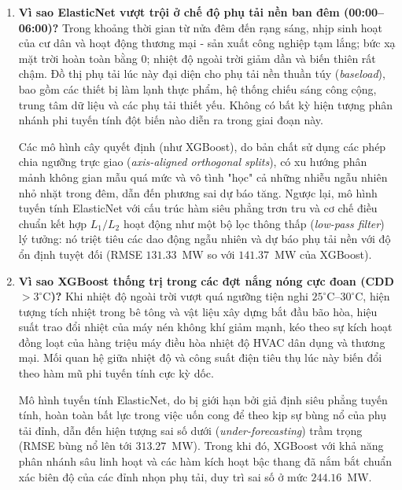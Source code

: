 \begin{enumerate}
    \item \textbf{Vì sao ElasticNet vượt trội ở chế độ phụ tải nền ban đêm (00:00--06:00)?}
    Trong khoảng thời gian từ nửa đêm đến rạng sáng, nhịp sinh hoạt của cư dân và hoạt động thương mại - sản xuất công nghiệp tạm lắng; bức xạ mặt trời hoàn toàn bằng 0; nhiệt độ ngoài trời giảm dần và biến thiên rất chậm. Đồ thị phụ tải lúc này đại diện cho phụ tải nền thuần túy (\textit{baseload}), bao gồm các thiết bị làm lạnh thực phẩm, hệ thống chiếu sáng công cộng, trung tâm dữ liệu và các phụ tải thiết yếu. Không có bất kỳ hiện tượng phân nhánh phi tuyến tính đột biến nào diễn ra trong giai đoạn này. 
    
    Các mô hình cây quyết định (như XGBoost), do bản chất sử dụng các phép chia ngưỡng trực giao (\textit{axis-aligned orthogonal splits}), có xu hướng phân mảnh không gian mẫu quá mức và vô tình "học" cả những nhiễu ngẫu nhiên nhỏ nhặt trong đêm, dẫn đến phương sai dự báo tăng. Ngược lại, mô hình tuyến tính ElasticNet với cấu trúc hàm siêu phẳng trơn tru và cơ chế điều chuẩn kết hợp $L_1/L_2$ hoạt động như một bộ lọc thông thấp (\textit{low-pass filter}) lý tưởng: nó triệt tiêu các dao động ngẫu nhiên và dự báo phụ tải nền với độ ổn định tuyệt đối (RMSE $131.33$~MW so với $141.37$~MW của XGBoost).
    
    \item \textbf{Vì sao XGBoost thống trị trong các đợt nắng nóng cực đoan (CDD $> 3^\circ\text{C}$)?}
    Khi nhiệt độ ngoài trời vượt quá ngưỡng tiện nghi $25^\circ\text{C}$--$30^\circ\text{C}$, hiện tượng tích nhiệt trong bê tông và vật liệu xây dựng bắt đầu bão hòa, hiệu suất trao đổi nhiệt của máy nén không khí giảm mạnh, kéo theo sự kích hoạt đồng loạt của hàng triệu máy điều hòa nhiệt độ HVAC dân dụng và thương mại. Mối quan hệ giữa nhiệt độ và công suất điện tiêu thụ lúc này biến đổi theo hàm mũ phi tuyến tính cực kỳ dốc.
    
    Mô hình tuyến tính ElasticNet, do bị giới hạn bởi giả định siêu phẳng tuyến tính, hoàn toàn bất lực trong việc uốn cong để theo kịp sự bùng nổ của phụ tải đỉnh, dẫn đến hiện tượng sai số dưới (\textit{under-forecasting}) trầm trọng (RMSE bùng nổ lên tới $313.27$~MW). Trong khi đó, XGBoost với khả năng phân nhánh sâu linh hoạt và các hàm kích hoạt bậc thang đã nắm bắt chuẩn xác biên độ của các đỉnh nhọn phụ tải, duy trì sai số ở mức $244.16$~MW.
\end{enumerate}

